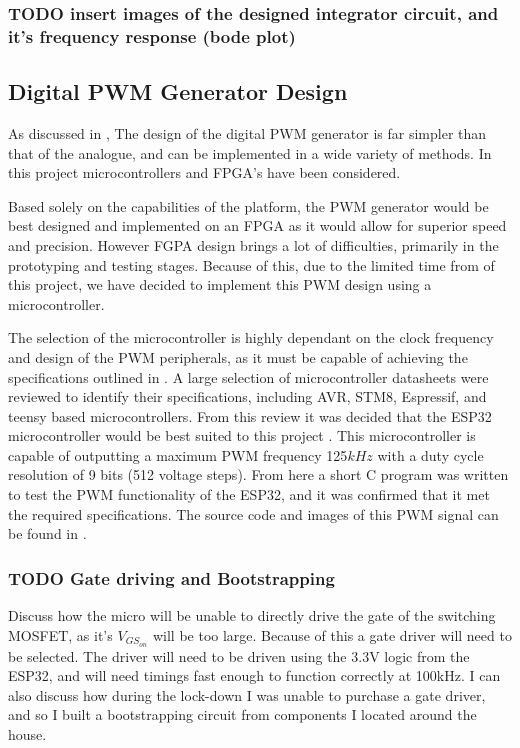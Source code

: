 \subsubsection{TODO insert images of the designed integrator circuit, and it's frequency response (bode plot)} 

\subsection{Digital PWM Generator Design}\label{S:PWM_digital_design}

As discussed in , The design of the digital PWM generator is far simpler than that of the analogue, and can be implemented in a wide variety of methods. In this project microcontrollers and FPGA's have been considered.

Based solely on the capabilities of the platform, the PWM generator would be best designed and implemented on an FPGA as it would allow for superior speed and precision. However FGPA design brings a lot of difficulties, primarily in the prototyping and testing stages. Because of this, due to the limited time from of this project, we have decided to implement this PWM design using a microcontroller.

The selection of the microcontroller is highly dependant on the clock frequency and design of the PWM peripherals, as it must be capable of achieving the specifications outlined in . A large selection of microcontroller datasheets were reviewed to identify their specifications, including AVR, STM8, Espressif, and teensy based microcontrollers. From this review it was decided that the ESP32 microcontroller would be best suited to this project \cite{ESP32Manual}. This microcontroller is capable of outputting a maximum PWM frequency 125$kHz$ with a duty cycle resolution of 9 bits (512 voltage steps). From here a short C program was written to test the PWM functionality of the ESP32, and it was confirmed that it met the required specifications. The source code and images of this PWM signal can be found in .

\subsubsection{TODO Gate driving and Bootstrapping} 

Discuss how the micro will be unable to directly drive the gate of the switching MOSFET, as it's $V_{GS_{on}}$ will be too large. Because of this a gate driver will need to be selected. The driver will need to be driven using the 3.3V logic from the ESP32, and will need timings fast enough to function correctly at 100kHz. I can also discuss how during the lock-down I was unable to purchase a gate driver, and so I built a bootstrapping circuit from components I located around the house. 
 


